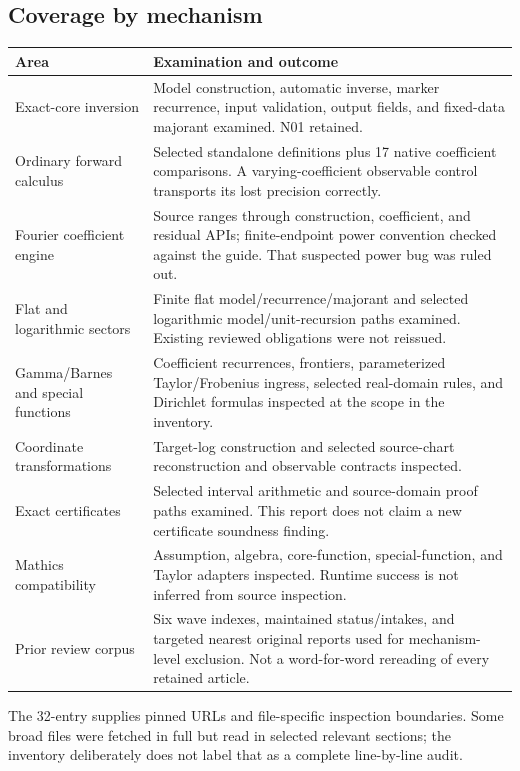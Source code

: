 \documentclass[11pt,letterpaper]{article}
\theoremstyle{remark}\newtheorem{remark}[theorem]{Remark}
\newcommand{\file}[1]{\path{#1}}
\begin{document}
\subsection{Coverage by mechanism}
\begin{longtable}{@{}p{}p{}@{}}
\toprule
Area & Examination and outcome\\
\midrule\endhead
Exact-core inversion & Model construction, automatic inverse, marker recurrence,
input validation, output fields, and fixed-data majorant examined. N01 retained.\\
Ordinary forward calculus & Selected standalone definitions plus 17 native
coefficient comparisons. A varying-coefficient observable control transports
its lost precision correctly.\\
Fourier coefficient engine & Source ranges through construction, coefficient,
and residual APIs; finite-endpoint power convention checked against the guide.
That suspected power bug was ruled out.\\
Flat and logarithmic sectors & Finite flat model/recurrence/majorant and selected
logarithmic model/unit-recursion paths examined. Existing reviewed obligations
were not reissued.\\
Gamma/Barnes and special functions & Coefficient recurrences, frontiers,
parameterized Taylor/Frobenius ingress, selected real-domain rules, and
Dirichlet formulas inspected at the scope in the inventory.\\
Coordinate transformations & Target-log construction and selected source-chart
reconstruction and observable contracts inspected.\\
Exact certificates & Selected interval arithmetic and source-domain proof paths
examined. This report does not claim a new certificate soundness finding.\\
Mathics compatibility & Assumption, algebra, core-function, special-function,
and Taylor adapters inspected. Runtime success is not inferred from source
inspection.\\
Prior review corpus & Six wave indexes, maintained status/intakes, and targeted
nearest original reports used for mechanism-level exclusion. Not a word-for-word
rereading of every retained article.\\
\bottomrule
\end{longtable}
The 32-entry \file{evidence/source-inventory.csv} supplies pinned URLs and
file-specific inspection boundaries. Some broad files were fetched in full but
read in selected relevant sections; the inventory deliberately does not label
that as a complete line-by-line audit.
\end{document}
